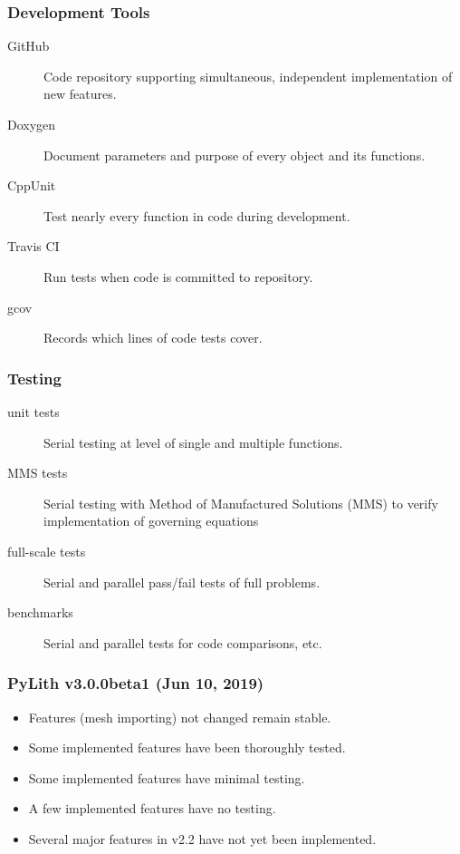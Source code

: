 \documentclass[aspectratio=169]{beamer}
\begin{document}
\begin{frame}
  \frametitle{Development Tools}

  \begin{description}
  \item[GitHub] Code repository supporting simultaneous, independent implementation of new features.
  \item[Doxygen] Document parameters and purpose of every object and its functions.
  \item[CppUnit] Test nearly every function in code during development.
  \item[Travis CI] Run tests when code is committed to repository.
  \item[gcov] Records which lines of code tests cover.
  \end{description}

\end{frame}

\begin{frame}
  \frametitle{Testing}

  \begin{description}
  \item[unit tests] Serial testing at level of single and multiple functions.
  \item[MMS tests] Serial testing with Method of Manufactured
    Solutions (MMS) to verify implementation of governing equations
  \item[full-scale tests] Serial and parallel pass/fail tests of full problems.
  \item[benchmarks] Serial and parallel tests for code comparisons, etc.
  \end{description}

\end{frame}

\newcommand{\statuslater}[1]{{\color{mdslate}#1}}
\newcommand{\statusdone}[1]{{\color{green}#1}}
\newcommand{\statusbuggy}[1]{{\color{orange}#1}}
\newcommand{\statusinprogress}[1]{{\color{red}#1}}
\begin{frame}
  \frametitle{PyLith v3.0.0beta1 (Jun 10, 2019)}

  \begin{itemize}
  \item Features (mesh importing) not changed remain stable.
  \item Some implemented features have been thoroughly tested.
  \item Some implemented features have minimal testing.
  \item A few implemented features have no testing.
  \item Several major features in v2.2 have not yet been implemented.
  \end{itemize}

\end{frame}
\end{document}
